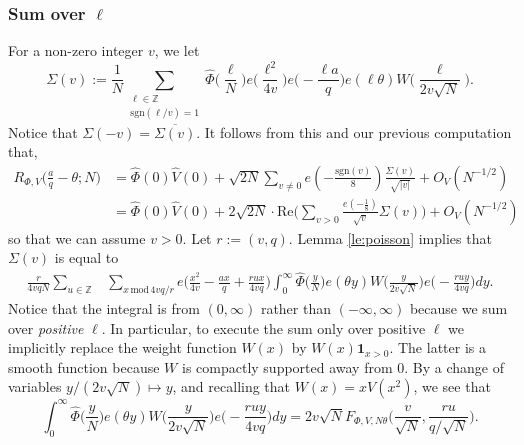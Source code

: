 \documentclass[12pt,reqno]{amsart}
\theoremstyle{plain}
\numberwithin{equation}{section}
\numberwithin{figure}{section}
\theoremstyle{plain}
\theoremstyle{definition}
\theoremstyle{remark}
\newcommand{\mmod}{\,\mathrm{mod}\,}
\begin{document}
\subsubsection{Sum over $\ell$}
For a non-zero integer $v$, we let
\begin{equation} \label{eq:start}
\Sigma(v) := \frac{1}{N} \sum_{\substack{\ell \in \mathbb{Z} \\
\mathrm{sgn}(\ell/v) = 1}} 
\widehat{\Phi} \Big ( \frac{\ell}{N} \Big ) e \Big ( \frac{\ell^2}{4 v} \Big ) 
e \Big ( - \frac{\ell a}{q} \Big )
e(\ell \theta) W \Big ( \frac{\ell}{2 v \sqrt{N}} \Big ).
\end{equation}
Notice that $\Sigma(-v) = \overline{\Sigma(v)}$. It follows from this and our previous computation that, 
\begin{align} \nonumber
R_{\Phi, V} \Big ( \frac{a}{q} - \theta; N \Big ) 
& = \widehat{\Phi} (0) \widehat{V}(0)
+ \sqrt{2N} \sum_{v \neq 0}  e ( -\tfrac{\mathrm{sgn}(v)}{8} )
\frac{\Sigma(v)}{\sqrt{|v|}} 
+ O_{V}(N^{-1/2}) \\ \label{eq:masterz} & 
= \widehat{\Phi}(0) \widehat{V}(0)
+ 2 \sqrt{2 N} \cdot \mathrm{Re} 
\Big ( \sum_{v > 0} \frac{e( - \tfrac 18 )}
{\sqrt{v}} \Sigma(v) \Big ) + O_{V}(N^{-1/2})
\end{align}
so that we can assume $v > 0$.
Let $r := (v,q)$.
Lemma \ref{le:poisson} implies that $\Sigma(v)$ is equal to 
\begin{align*}
\frac{r}{4v q N} \sum_{u \in \mathbb{Z}} 
& \sum_{x \mmod{4v q/ r}} 
e \Big ( \frac{x^2}{4 v} - \frac{a x}{q} 
+ \frac{r u x}{4 v q}  \Big ) \int_{0}^{\infty} 
\widehat{\Phi} \Big ( \frac{y}{N} \Big ) 
 e ( \theta y) 
 W \Big ( \frac{y}{2v \sqrt{N}} \Big ) 
 e \Big ( - \frac{r u y}{4 v q} \Big ) dy.
\end{align*}
Notice that the integral is from $(0, \infty)$ rather than $(-\infty, \infty)$ because 
we sum over \textit{positive} $\ell$. In particular, to execute the sum only over positive $\ell$ we implicitly replace the weight function $W(x)$ by $W(x) \mathbf{1}_{x > 0}$. The latter is a smooth function because $W$ is compactly supported away from $0$.  
By a change of variables $y / (2 v \sqrt{N}) \mapsto y$, and recalling that $W(x) = x V(x^2)$, we see that 
$$\int_{0}^{\infty} 
\widehat{\Phi} \Big ( \frac{y}{N} \Big ) 
 e ( \theta y) 
 W \Big ( \frac{y}{2v \sqrt{N}} \Big ) 
 e \Big ( - \frac{r u y}{4 v q} \Big ) dy 
 = 2 v \sqrt{N} F_{\Phi, V, N\theta} 
\Big ( \frac{v}{\sqrt{N}}, \frac{r u}{q / \sqrt{N}} \Big ).$$
\end{document}
